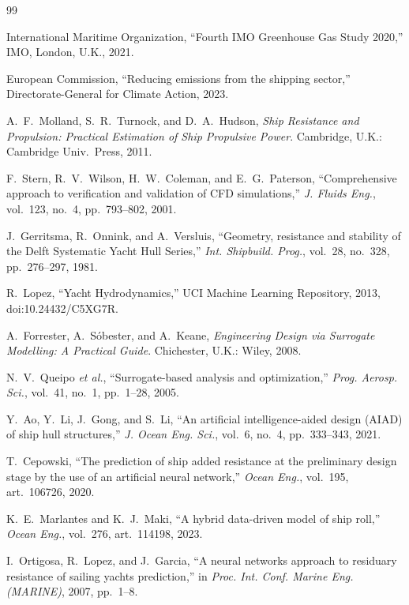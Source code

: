 \documentclass[conference]{IEEEtran}
\begin{document}
\begin{thebibliography}{99}

 International Maritime Organization, ``Fourth IMO Greenhouse
Gas Study 2020,'' IMO, London, U.K., 2021.

 European Commission, ``Reducing emissions from the shipping
sector,'' Directorate-General for Climate Action, 2023.

 A.~F.~Molland, S.~R.~Turnock, and D.~A.~Hudson,
\emph{Ship Resistance and Propulsion: Practical Estimation of Ship Propulsive
Power}. Cambridge, U.K.: Cambridge Univ.\ Press, 2011.

 F.~Stern, R.~V.~Wilson, H.~W.~Coleman, and E.~G.~Paterson,
``Comprehensive approach to verification and validation of CFD simulations,''
\emph{J. Fluids Eng.}, vol.~123, no.~4, pp.~793--802, 2001.

 J.~Gerritsma, R.~Onnink, and A.~Versluis, ``Geometry,
resistance and stability of the Delft Systematic Yacht Hull Series,''
\emph{Int. Shipbuild. Prog.}, vol.~28, no.~328, pp.~276--297, 1981.

 R.~Lopez, ``Yacht Hydrodynamics,'' UCI Machine Learning
Repository, 2013, doi:10.24432/C5XG7R.

 A.~Forrester, A.~S{\'o}bester, and A.~Keane,
\emph{Engineering Design via Surrogate Modelling: A Practical Guide}.
Chichester, U.K.: Wiley, 2008.

 N.~V.~Queipo \emph{et al.}, ``Surrogate-based analysis and
optimization,'' \emph{Prog. Aerosp. Sci.}, vol.~41, no.~1, pp.~1--28, 2005.

 Y.~Ao, Y.~Li, J.~Gong, and S.~Li, ``An artificial
intelligence-aided design (AIAD) of ship hull structures,'' \emph{J. Ocean Eng.
Sci.}, vol.~6, no.~4, pp.~333--343, 2021.

 T.~Cepowski, ``The prediction of ship added resistance at
the preliminary design stage by the use of an artificial neural network,''
\emph{Ocean Eng.}, vol.~195, art.~106726, 2020.

 K.~E.~Marlantes and K.~J.~Maki, ``A hybrid data-driven
model of ship roll,'' \emph{Ocean Eng.}, vol.~276, art.~114198, 2023.

 I.~Ortigosa, R.~Lopez, and J.~Garcia, ``A neural networks
approach to residuary resistance of sailing yachts prediction,'' in
\emph{Proc. Int. Conf. Marine Eng. (MARINE)}, 2007, pp.~1--8.


\end{thebibliography}
\end{document}
